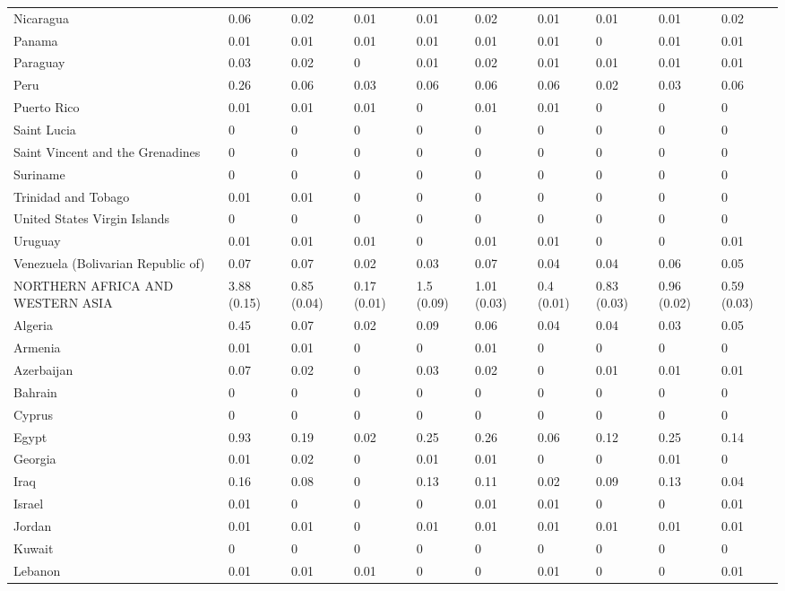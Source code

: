 \begin{longtable}[t]{llllllllll}
Nicaragua & 0.06 & 0.02 & 0.01 & 0.01 & 0.02 & 0.01 & 0.01 & 0.01 & 0.02\\
Panama & 0.01 & 0.01 & 0.01 & 0.01 & 0.01 & 0.01 & 0 & 0.01 & 0.01\\
Paraguay & 0.03 & 0.02 & 0 & 0.01 & 0.02 & 0.01 & 0.01 & 0.01 & 0.01\\
Peru & 0.26 & 0.06 & 0.03 & 0.06 & 0.06 & 0.06 & 0.02 & 0.03 & 0.06\\
Puerto Rico & 0.01 & 0.01 & 0.01 & 0 & 0.01 & 0.01 & 0 & 0 & 0\\
Saint Lucia & 0 & 0 & 0 & 0 & 0 & 0 & 0 & 0 & 0\\
Saint Vincent and the Grenadines & 0 & 0 & 0 & 0 & 0 & 0 & 0 & 0 & 0\\
Suriname & 0 & 0 & 0 & 0 & 0 & 0 & 0 & 0 & 0\\
Trinidad and Tobago & 0.01 & 0.01 & 0 & 0 & 0 & 0 & 0 & 0 & 0\\
United States Virgin Islands & 0 & 0 & 0 & 0 & 0 & 0 & 0 & 0 & 0\\
Uruguay & 0.01 & 0.01 & 0.01 & 0 & 0.01 & 0.01 & 0 & 0 & 0.01\\
Venezuela (Bolivarian Republic of) & 0.07 & 0.07 & 0.02 & 0.03 & 0.07 & 0.04 & 0.04 & 0.06 & 0.05\\
NORTHERN AFRICA AND WESTERN ASIA & 3.88 (0.15) & 0.85 (0.04) & 0.17 (0.01) & 1.5 (0.09) & 1.01 (0.03) & 0.4 (0.01) & 0.83 (0.03) & 0.96 (0.02) & 0.59 (0.03)\\
Algeria & 0.45 & 0.07 & 0.02 & 0.09 & 0.06 & 0.04 & 0.04 & 0.03 & 0.05\\
Armenia & 0.01 & 0.01 & 0 & 0 & 0.01 & 0 & 0 & 0 & 0\\
Azerbaijan & 0.07 & 0.02 & 0 & 0.03 & 0.02 & 0 & 0.01 & 0.01 & 0.01\\
Bahrain & 0 & 0 & 0 & 0 & 0 & 0 & 0 & 0 & 0\\
Cyprus & 0 & 0 & 0 & 0 & 0 & 0 & 0 & 0 & 0\\
Egypt & 0.93 & 0.19 & 0.02 & 0.25 & 0.26 & 0.06 & 0.12 & 0.25 & 0.14\\
Georgia & 0.01 & 0.02 & 0 & 0.01 & 0.01 & 0 & 0 & 0.01 & 0\\
Iraq & 0.16 & 0.08 & 0 & 0.13 & 0.11 & 0.02 & 0.09 & 0.13 & 0.04\\
Israel & 0.01 & 0 & 0 & 0 & 0.01 & 0.01 & 0 & 0 & 0.01\\
Jordan & 0.01 & 0.01 & 0 & 0.01 & 0.01 & 0.01 & 0.01 & 0.01 & 0.01\\
Kuwait & 0 & 0 & 0 & 0 & 0 & 0 & 0 & 0 & 0\\
Lebanon & 0.01 & 0.01 & 0.01 & 0 & 0 & 0.01 & 0 & 0 & 0.01\\

\end{longtable}
